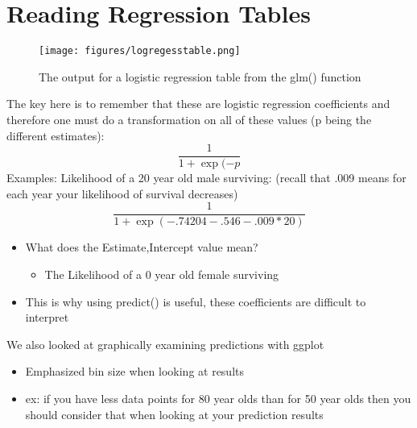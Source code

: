 \section{Reading Regression Tables}
\begin{figure}[ht]
  \begin{center}
    \texttt{[image: figures/logregesstable.png]}
    \caption{ The output for a logistic regression table from the glm() function 
     }
    \label{fig:example_figure}
  \end{center}
\end{figure}
The key here is to remember that these are logistic regression coefficients and therefore one must do a transformation on all of these values (p being the different estimates):
\begin{equation}
    \frac{1}{1+\exp(-p}
\end{equation}
Examples: 
Likelihood of a 20 year old male surviving: (recall that .009 means for each year your likelihood of survival decreases) 
\begin{equation}
    \frac{1}{1+\exp(-.74204-.546-.009*20)}
\end{equation}
\begin{itemize}
    \item What does the Estimate,Intercept value mean? 
    \begin{itemize}
        \item The Likelihood of a 0 year old female surviving
    \end{itemize}
    \item This is why using predict() is useful, these coefficients are difficult to interpret 
\end{itemize}
We also looked at graphically examining predictions with ggplot
\begin{itemize}
    \item Emphasized bin size when looking at results
    \item ex: if you have less data points for 80 year olds than for 50 year olds then you should consider that when looking at your prediction results
\end{itemize}

